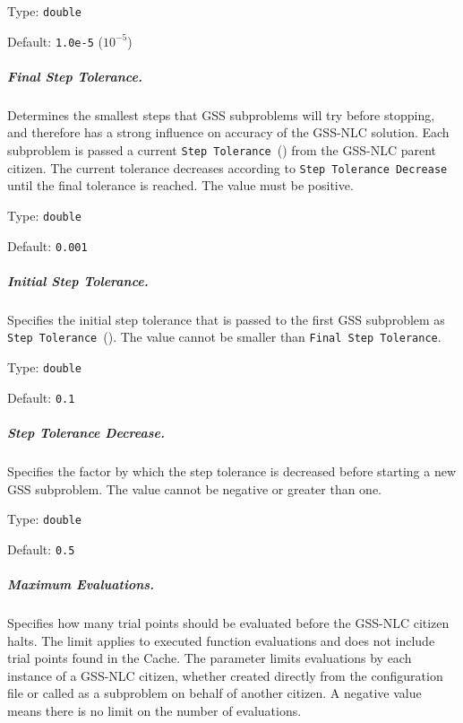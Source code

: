 \hspace{0.2in}
Type: {\tt double}

\hspace{0.2in}
Default: {\tt 1.0e-5} ($10^{-5}$)

\subparagraph{Final Step Tolerance.}  \label{param:GSN-finalstep}
Determines the smallest steps that GSS subproblems will try before stopping,
and therefore has a strong influence on accuracy of the GSS-NLC solution.
Each subproblem is passed a current
{\tt Step Tolerance}~() from the GSS-NLC parent citizen.
The current tolerance decreases according to {\tt Step Tolerance Decrease}
until the final tolerance is reached.
The value must be positive.

\hspace{0.2in}
Type: {\tt double}

\hspace{0.2in}
Default: {\tt 0.001}

\subparagraph{Initial Step Tolerance.}  \label{param:GSN-initialstep}
Specifies the initial step tolerance that is passed to the first GSS
subproblem as {\tt Step Tolerance}~().
The value cannot be smaller than {\tt Final Step Tolerance}.

\hspace{0.2in}
Type: {\tt double}

\hspace{0.2in}
Default: {\tt 0.1}

\subparagraph{Step Tolerance Decrease.}  \label{param:GSN-steptoldecrease}
Specifies the factor by which the step tolerance is decreased before
starting a new GSS subproblem.
The value cannot be negative or greater than one.

\hspace{0.2in}
Type: {\tt double}

\hspace{0.2in}
Default: {\tt 0.5}

\subparagraph{Maximum Evaluations.}  \label{param:GSN-maxeval}
Specifies how many trial points should be evaluated before the GSS-NLC citizen
halts.  The limit applies to executed function evaluations and does not include
trial points found in the Cache.
The parameter limits evaluations by each instance of a GSS-NLC citizen, whether
created directly from the configuration file or called as a subproblem on
behalf of another citizen.
A negative value means there is no limit on the number of evaluations.

